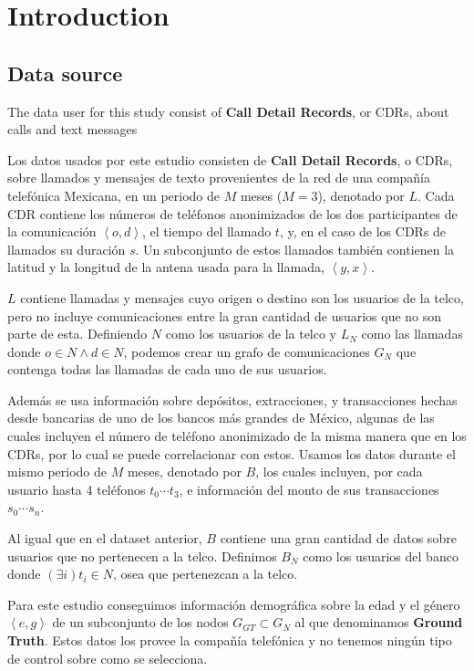 \section{Introduction}

\subsection{Data source}

The data user for this study consist of \textbf{Call Detail Records}, or CDRs, about calls and text messages 

Los datos usados por este estudio consisten de \textbf{Call Detail Records}, o CDRs, sobre llamados y mensajes de texto provenientes de la red de una compañía telefónica Mexicana, en un periodo de \( M \) meses (\( M = 3 \)), denotado por \( L \). Cada CDR contiene los números de teléfonos anonimizados de los dos participantes de la comunicación \(\left<o, d\right>\), el tiempo del llamado \(t\), y, en el caso de los CDRs de llamados su duración \(s\). Un subconjunto de estos llamados también contienen la latitud y la longitud de la antena usada para la llamada, \(\left<y, x\right>\).

\( L \) contiene llamadas y mensajes cuyo origen o destino son los usuarios de la telco, pero no incluye comunicaciones entre la gran cantidad de usuarios que no son parte de esta. Definiendo \( N \) como los usuarios de la telco y \( L_N \) como las llamadas donde \( o \in N \wedge d \in N \), podemos crear un grafo de comunicaciones \( G_N \) que contenga todas las llamadas de cada uno de sus usuarios.

Además se usa información sobre depósitos, extracciones, y transacciones hechas desde bancarias de uno de los bancos más grandes de México, algunas de las cuales incluyen el número de teléfono anonimizado de la misma manera que en los CDRs, por lo cual se puede correlacionar con estos. Usamos los datos durante el mismo periodo de \( M \) meses, denotado por \( B \), los cuales incluyen, por cada usuario hasta 4 teléfonos \( t_0 \cdots t_3 \), e información del monto de sus transacciones \( s_0 \cdots s_n \).

Al igual que en el dataset anterior, \( B \) contiene una gran cantidad de datos sobre usuarios que no pertenecen a la telco. Definimos \( B_N \) como los usuarios del banco donde \( \left( \exists i \right) t_i \in N \), osea que pertenezcan a la telco.

Para este estudio conseguimos información demográfica sobre la edad y el género \( \left<e, g\right> \) de un subconjunto de los nodos \( G_{GT} \subset G_N \) al que denominamos \textbf{Ground Truth}. Estos datos los provee la compañía telefónica y no tenemos ningún tipo de control sobre como se selecciona.

